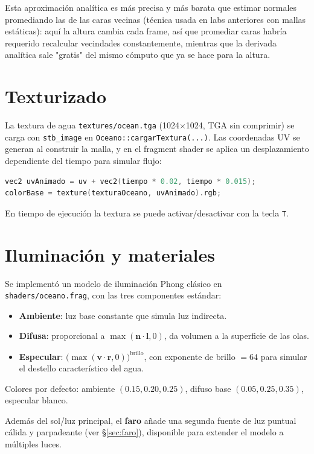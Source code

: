 \documentclass[11pt]{article}
\begin{document}
Esta aproximación analítica es más precisa y más barata que estimar
normales promediando las de las caras vecinas (técnica usada en labs
anteriores con mallas estáticas): aquí la altura cambia cada frame, así
que promediar caras habría requerido recalcular vecindades constantemente,
mientras que la derivada analítica sale "gratis" del mismo cómputo que ya
se hace para la altura.

\section{Texturizado}
La textura de agua \texttt{textures/ocean.tga} (1024$\times$1024, TGA sin
comprimir) se carga con \texttt{stb\_image} en
\texttt{Oceano::cargarTextura(...)}. Las coordenadas UV se generan al
construir la malla, y en el fragment shader se aplica un desplazamiento
dependiente del tiempo para simular flujo:

\begin{lstlisting}[language=C,caption={Animación de UV en shaders/oceano.frag}]
vec2 uvAnimado = uv + vec2(tiempo * 0.02, tiempo * 0.015);
colorBase = texture(texturaOceano, uvAnimado).rgb;
\end{lstlisting}

En tiempo de ejecución la textura se puede activar/desactivar con la tecla
\texttt{T}.

\section{Iluminación y materiales}
Se implementó un modelo de iluminación Phong clásico en
\texttt{shaders/oceano.frag}, con las tres componentes estándar:
\begin{itemize}
    \item \textbf{Ambiente}: luz base constante que simula luz indirecta.
    \item \textbf{Difusa}: proporcional a $\max(\mathbf{n}\cdot\mathbf{l}, 0)$,
    da volumen a la superficie de las olas.
    \item \textbf{Especular}: $\big(\max(\mathbf{v}\cdot\mathbf{r}, 0)\big)^{\text{brillo}}$,
    con exponente de brillo $=64$ para simular el destello característico
    del agua.
\end{itemize}
Colores por defecto: ambiente $(0.15, 0.20, 0.25)$, difuso base
$(0.05, 0.25, 0.35)$, especular blanco.

Además del sol/luz principal, el \textbf{faro} añade una segunda fuente de
luz puntual cálida y parpadeante (ver \S\ref{sec:faro}), disponible para
extender el modelo a múltiples luces.
\end{document}
